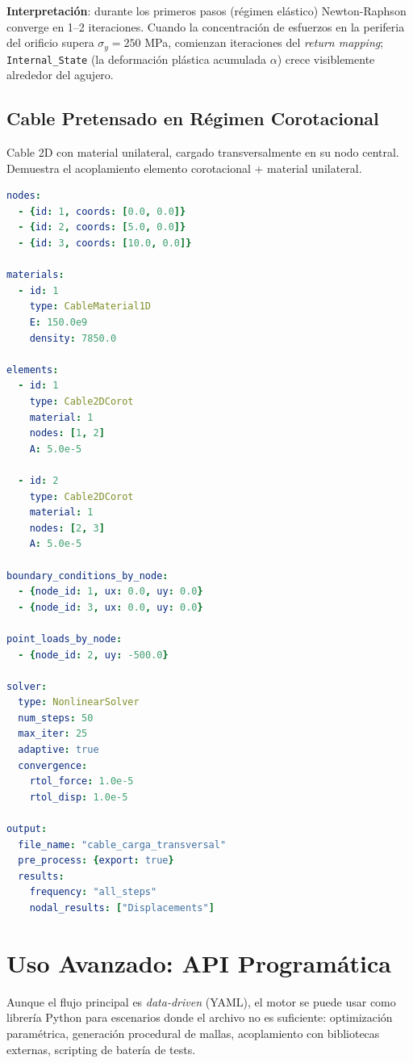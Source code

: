 \documentclass[11pt,oneside]{report}
\begin{document}
\textbf{Interpretación}: durante los primeros pasos (régimen elástico) Newton-Raphson converge en 1--2 iteraciones. Cuando la concentración de esfuerzos en la periferia del orificio supera $\sigma_y = 250$ MPa, comienzan iteraciones del \textit{return mapping}; \texttt{Internal\_State} (la deformación plástica acumulada $\alpha$) crece visiblemente alrededor del agujero.

\section{Cable Pretensado en Régimen Corotacional}

Cable 2D con material unilateral, cargado transversalmente en su nodo central. Demuestra el acoplamiento elemento corotacional + material unilateral.

\begin{lstlisting}[language=yaml]
nodes:
  - {id: 1, coords: [0.0, 0.0]}
  - {id: 2, coords: [5.0, 0.0]}
  - {id: 3, coords: [10.0, 0.0]}

materials:
  - id: 1
    type: CableMaterial1D
    E: 150.0e9
    density: 7850.0

elements:
  - id: 1
    type: Cable2DCorot
    material: 1
    nodes: [1, 2]
    A: 5.0e-5

  - id: 2
    type: Cable2DCorot
    material: 1
    nodes: [2, 3]
    A: 5.0e-5

boundary_conditions_by_node:
  - {node_id: 1, ux: 0.0, uy: 0.0}
  - {node_id: 3, ux: 0.0, uy: 0.0}

point_loads_by_node:
  - {node_id: 2, uy: -500.0}

solver:
  type: NonlinearSolver
  num_steps: 50
  max_iter: 25
  adaptive: true
  convergence:
    rtol_force: 1.0e-5
    rtol_disp: 1.0e-5

output:
  file_name: "cable_carga_transversal"
  pre_process: {export: true}
  results:
    frequency: "all_steps"
    nodal_results: ["Displacements"]

\end{lstlisting}


\newpage

\chapter{Uso Avanzado: API Programática}
\label{cap:11}



Aunque el flujo principal es \textit{data-driven} (YAML), el motor se puede usar como librería Python para escenarios donde el archivo no es suficiente: optimización paramétrica, generación procedural de mallas, acoplamiento con bibliotecas externas, scripting de batería de tests.
\end{document}
